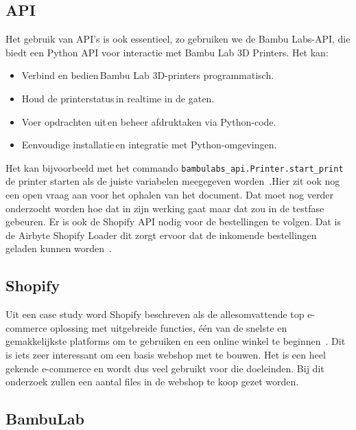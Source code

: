 \subsection{API}%

Het gebruik van API’s is ook essentieel, zo gebruiken we de Bambu Labs-API, die biedt een Python API voor interactie met Bambu Lab 3D Printers. Het kan: 

\begin{itemize}
\item Verbind en bedien Bambu Lab 3D-printers programmatisch. 
\item Houd de printerstatus in realtime in de gaten. 
\item Voer opdrachten uit en beheer afdruktaken via Python-code. 
\item Eenvoudige installatie en integratie met Python-omgevingen. 
\end{itemize}

Het kan bijvoorbeeld met het commando \texttt{bambulabs\_api.Printer.start\_print} de printer starten als  de juiste variabelen meegegeven worden~\autocite{bambulabsAPI}.Hier zit ook nog een open vraag aan voor het ophalen van het document. Dat moet nog verder onderzocht worden hoe dat in zijn werking gaat maar dat zou in de testfase gebeuren.  Er is ook de Shopify API nodig voor de bestellingen te volgen. Dat is de Airbyte Shopify Loader dit zorgt ervoor dat de inkomende bestellingen geladen kunnen worden~\autocite{ilamaIndexShopify}. 



\subsection{Shopify}%

Uit een case study word Shopify beschreven als de allesomvattende top e-commerce oplossing met uitgebreide functies, één van de snelste en gemakkelijkste platforms om te gebruiken en een online winkel te beginnen~\autocite{bang2024}. Dit is iets zeer interessant om een basis webshop met te bouwen. Het is een heel gekende e-commerce en wordt dus veel gebruikt voor die doeleinden. Bij dit onderzoek zullen een aantal files in de webshop te koop gezet worden.

\subsection{BambuLab}%


